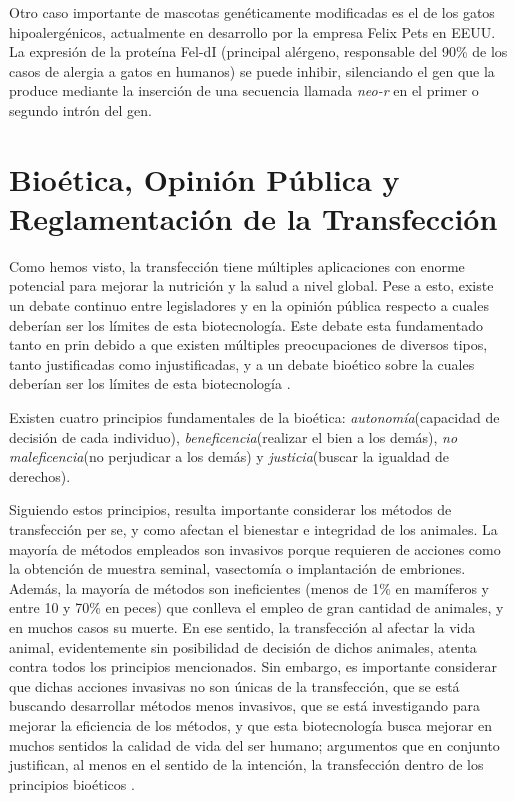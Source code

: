 \documentclass[fleqn,10pt]{SelfArx} %
\begin{document}
    Otro caso importante de mascotas genéticamente modificadas es el de los gatos hipoalergénicos, actualmente en desarrollo por la empresa Felix Pets en EEUU. La expresión de la proteína Fel-dI (principal alérgeno, responsable del 90\% de los casos de alergia a gatos en humanos) se puede inhibir, silenciando el gen que la produce mediante la inserción de una secuencia llamada \textit{neo-r} en el primer o segundo intrón del gen\cite{avner2012method, butt2012hypoallergenic}. 
  
\section{Bioética, Opinión Pública y Reglamentación de la Transfección }

Como hemos visto, la transfección tiene múltiples aplicaciones con enorme potencial para mejorar la nutrición y la salud a nivel global. Pese a esto, existe un debate continuo entre legisladores y en la opinión pública respecto a cuales deberían ser los límites de esta biotecnología. Este debate esta fundamentado tanto en prin debido a que existen múltiples preocupaciones de diversos tipos, tanto justificadas como injustificadas, y a un debate bioético sobre la cuales deberían ser los límites de esta biotecnología \cite{berkowitz1993food, berkowitz1994transgenic, mepham1998use, christiansen2000bioethics, Iredale, Cooley, Rowland, Verhoog2003294, Spink, Jefferson,lassen2006after, Ormandy}.

Existen cuatro principios fundamentales de la bioética: \textit{autonomía}(capacidad de decisión de cada individuo), \textit{beneficencia}(realizar el bien a los demás), \textit{no maleficencia}(no perjudicar a los demás) y \textit{justicia}(buscar la igualdad de derechos)\cite{Cooley, tsai2005bioethical}.

Siguiendo estos principios, resulta importante considerar los métodos de transfección per se, y como afectan el bienestar e integridad de los animales. La mayoría de métodos empleados son invasivos porque requieren de acciones como la obtención de muestra seminal, vasectomía o implantación de embriones. Además, la mayoría de métodos son ineficientes (menos de 1\% en mamíferos y entre 10 y 70\% en peces)  que conlleva el empleo de gran cantidad de animales, y en muchos casos su muerte. En ese sentido, la transfección al afectar la vida animal, evidentemente sin posibilidad de decisión de dichos animales, atenta contra todos los principios mencionados. Sin embargo, es importante considerar que dichas acciones invasivas no son únicas de la transfección, que se está buscando desarrollar métodos menos invasivos, que se está investigando para mejorar la eficiencia de los métodos, y que esta biotecnología busca mejorar en muchos sentidos la calidad de vida del ser humano; argumentos que en conjunto justifican, al menos en el sentido de la intención, la transfección dentro de los principios bioéticos \cite{mepham1998use,christiansen2000bioethics, lassen2006after, niemann2007transgenic, Ormandy}. 
\end{document}

